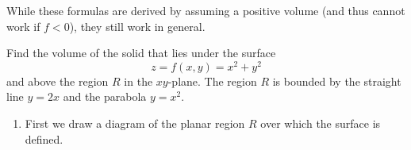\begin{itemize}
\begin{center}
          \end{center}
          \begin{idea}
              While these formulas are derived by assuming a positive volume (and thus cannot work if $f < 0$), they still work in general.
          \end{idea}
          \begin{example}
              Find the volume of the solid that lies under the surface
              \begin{equation}
                  z=f(x,y) = x^2+y^2
              \end{equation}
              and above the region $R$ in the $xy$-plane. The region $R$ is bounded by the straight line $y=2x$ and the parabola $y=x^2$.
              \begin{enumerate}
                  \item First we draw a diagram of the planar region $R$ over which the surface is defined.
                        \begin{center}
\end{center}
\end{enumerate}
\end{example}
\end{itemize}
